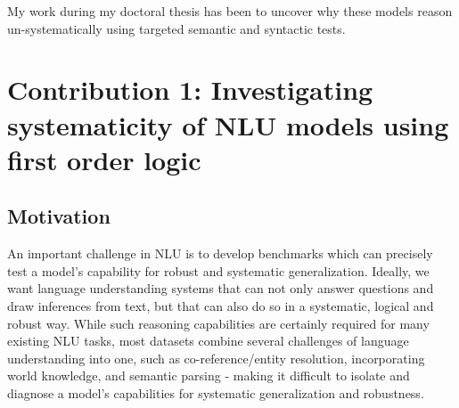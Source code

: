 \documentclass[12pt]{article}
\begin{document}
My work during my doctoral thesis has been to uncover why these models reason un-systematically using targeted semantic and syntactic tests.












\section{Contribution 1: Investigating systematicity of NLU models using first order logic}
\label{sec:cont1}

\subsection{Motivation}

An important challenge in NLU is to develop benchmarks which can precisely test a model's capability for robust and systematic generalization. Ideally, we want language understanding systems that can not only answer questions and draw inferences from text, but that can also do so in a systematic, logical and robust way. While such reasoning capabilities are certainly required for many existing NLU tasks, most datasets combine several challenges of language understanding into one, such as co-reference/entity resolution, incorporating world knowledge, and semantic parsing - making it difficult to isolate and diagnose a model's capabilities for systematic generalization and robustness.
\end{document}
